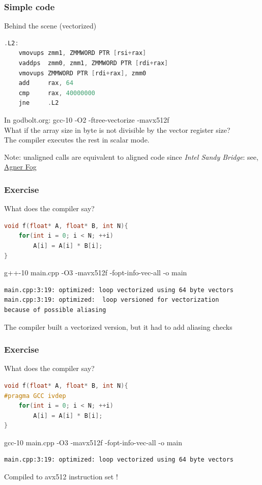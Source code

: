 \documentclass{beamer}
\begin{document}
\begin{frame}[fragile]
\frametitle{Simple code}
\begin{block}{Behind the scene (vectorized)}
\begin{lstlisting}[language=C++, caption={Vectorization example}]
.L2:
    vmovups zmm1, ZMMWORD PTR [rsi+rax]
    vaddps  zmm0, zmm1, ZMMWORD PTR [rdi+rax]
    vmovups ZMMWORD PTR [rdi+rax], zmm0
    add     rax, 64
    cmp     rax, 40000000
    jne     .L2
\end{lstlisting}
\end{block}
In godbolt.org: gcc-10 -O2 -ftree-vectorize -mavx512f\\
\pause
What if the array size in byte is not divisible by the vector register size? \\
\pause 
The compiler executes the rest in scalar mode.

\footnotesize{Note: unaligned calls are equivalent to aligned code since \textit{Intel Sandy Bridge}: see, \href{run: https://www.agner.org/optimize/instruction_tables.pdf}{Agner Fog}}
\end{frame}

\begin{frame}[fragile]
\frametitle{Exercise}
\begin{block}{What does the compiler say?}
\begin{lstlisting}[language=C++, caption={Vectorization example}]
void f(float* A, float* B, int N){
    for(int i = 0; i < N; ++i)
        A[i] = A[i] * B[i];
}
\end{lstlisting}
\end{block}
g++-10 main.cpp -O3 -mavx512f -fopt-info-vec-all -o main\\
\pause
\footnotesize \begin{lstlisting}[language=bash]
main.cpp:3:19: optimized: loop vectorized using 64 byte vectors
main.cpp:3:19: optimized:  loop versioned for vectorization 
because of possible aliasing
\end{lstlisting}
The compiler built a vectorized version, but it had to add aliasing checks
\end{frame}

\begin{frame}[fragile]
\frametitle{Exercise}
\begin{block}{What does the compiler say?}
\begin{lstlisting}[language=C++, caption={Vectorization example}]
void f(float* A, float* B, int N){
#pragma GCC ivdep
    for(int i = 0; i < N; ++i)
        A[i] = A[i] * B[i];
}
\end{lstlisting}
\end{block}
gcc-10 main.cpp -O3 -mavx512f -fopt-info-vec-all -o main\\
\pause
\footnotesize \begin{lstlisting}[language=bash]
main.cpp:3:19: optimized: loop vectorized using 64 byte vectors
\end{lstlisting}
Compiled to avx512 instruction set !
\end{frame}
\end{document}
